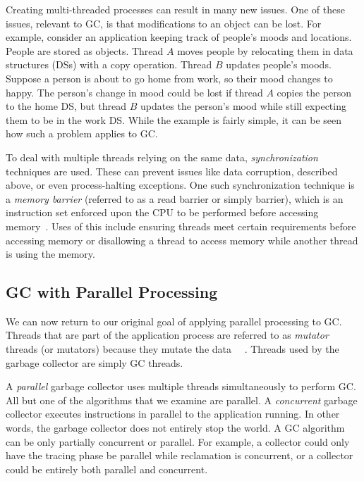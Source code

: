 \documentclass{sig-alternate}
\begin{document}
Creating multi-threaded processes can result in many new issues.
One of these issues, relevant to GC, is that modifications to an 
object can be lost. For example, consider an application keeping 
track of people's moods and locations. People are stored as objects.
Thread $A$ moves people by relocating them in data structures (DSs) 
with a copy operation. Thread $B$ updates people's moods. Suppose a person
is about to go home from work, so their mood changes to happy.
The person's change in mood could be lost if thread $A$ copies the person
to the home DS, but thread $B$ updates the person's mood while still expecting
them to be in the work DS. 
While the example is fairly simple, it can be seen how such a problem
applies to GC.

To deal with multiple threads relying on the same data, \emph{synchronization}
techniques are used. These can prevent issues 
like data corruption, described above, or even process-halting exceptions. 
One such synchronization technique is a \emph{memory barrier} (referred to 
as a read barrier or simply barrier), which is an instruction set enforced upon the 
CPU to be performed before accessing memory~\cite{wiki:barrier}. Uses of this include ensuring threads
meet certain requirements before accessing memory or disallowing a thread to
access memory while another thread is using the memory.


\subsection{GC with Parallel Processing}
\label{sec:parallelProcessingGarbageCollection}

We can now return to our original goal of applying parallel processing to GC.
Threads that are part of the application process are referred to as \emph{mutator}
threads (or mutators) because they mutate the data~\cite{Tene:C4}~\cite{Iyengar:Collie}
\cite{Osterlund:FPP}. Threads used by the garbage collector are simply GC threads.

A \emph{parallel} garbage collector uses
multiple threads simultaneously to perform GC.~\cite{Puffitsch:background}
All but one of the algorithms that we examine are parallel. A \emph{concurrent} garbage
collector executes instructions in parallel to the application running. In other 
words, the garbage collector does not entirely stop the world. A GC algorithm
can be only partially concurrent or parallel. For example, a collector could
only have the tracing phase be parallel while reclamation is concurrent, or 
a collector could be entirely both parallel and concurrent.
\end{document}
